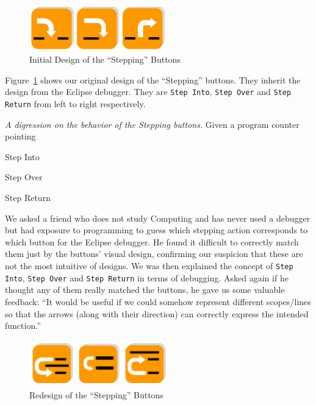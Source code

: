 \documentclass[11pt, a4paper]{article}
\newcommand{\cmd}[1]{{\tt #1}}
\begin{document}
\begin{figure}[h!]
\centering
\includegraphics[height=20mm,width=60mm]{buttons1.png}
\caption{Initial Design of the ``Stepping'' Buttons}
\label{fig:button1}
\end{figure}

Figure~\ref{fig:button1} shows our original design of the ``Stepping'' buttons.
They inherit the design from the Eclipse debugger.
They are \cmd{Step Into}, \cmd{Step Over} and \cmd{Step Return} from left to right respectively.

\begin{framed}
\emph{A digression on the behavior of the Stepping buttons.}
Given a program counter pointing 
\begin{description}
\item Step Into
\item Step Over
\item Step Return
\end{description}

\end{framed}


We asked a friend who does not study Computing and has never used a debugger but had exposure to programming to guess which stepping action corresponds to which button for the Eclipse debugger.
He found it difficult to correctly match them just by the buttons' visual design, confirming our suspicion that these are not the most intuitive of designs.
We was then explained the concept of \cmd{Step Into}, \cmd{Step Over} and \cmd{Step Return} in terms of debugging. Asked again if he thought any of them really matched the buttons, he gave us some valuable feedback: ``It would be useful if we could somehow represent different scopes/lines so that the arrows (along with their direction) can correctly express the intended function.''
\begin{figure}[h!]
\centering
\includegraphics[height=20mm,width=60mm]{buttons2.png}
\caption{Redesign of the ``Stepping'' Buttons}
\label{fig:buttons2}
\end{figure}
\end{document}
